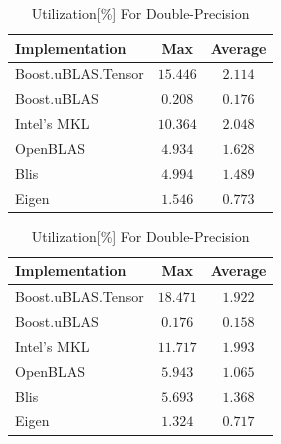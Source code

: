 \begin{table}[ht]
    \centering
    \caption{Utilization[\%] For Single-Precision}
    \begin{tabular}{|l|c|c|}
        \hline
        \textbf{Implementation} & \textbf{Max} & \textbf{Average}\\
        \hline
        Boost.uBLAS.Tensor  & $15.446$& $2.114$ \\
        \hline
        Boost.uBLAS         & $0.208$& $0.176$ \\
        \hline
        Intel's MKL         & $10.364$& $2.048$ \\
        \hline
        OpenBLAS            & $4.934$& $1.628$ \\
        \hline
        Blis                & $4.994$& $1.489$ \\
        \hline
        Eigen               & $1.546$& $0.773$ \\
        \hline
    \end{tabular}

    \vspace*{1 cm}

    \centering
    \caption{Utilization[\%] For Double-Precision}
    \begin{tabular}{|l|c|c|}
        \hline
        \textbf{Implementation} & \textbf{Max} & \textbf{Average}\\
        \hline
        Boost.uBLAS.Tensor  & $18.471$& $1.922$ \\
        \hline
        Boost.uBLAS         & $0.176$& $0.158$ \\
        \hline
        Intel's MKL         & $11.717$& $1.993$ \\
        \hline
        OpenBLAS            & $5.943$& $1.065$ \\
        \hline
        Blis                & $5.693$& $1.368$ \\
        \hline
        Eigen               & $1.324$& $0.717$ \\
        \hline
    \end{tabular}
\end{table}

